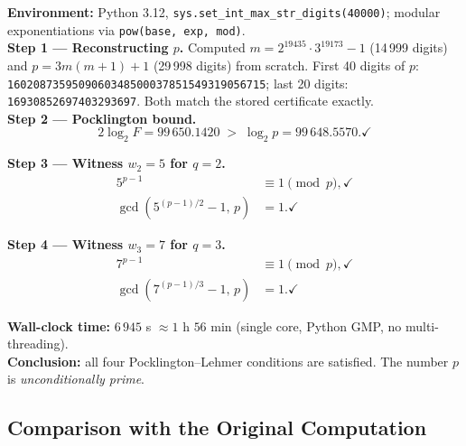 \begin{rigorousbox}[title={\textbf{Verification record} — independent computation}]
\textbf{Environment:} Python 3.12, \texttt{sys.set\_int\_max\_str\_digits(40000)};
modular exponentiations via \texttt{pow(base, exp, mod)}.\\[4pt]

\textbf{Step 1 — Reconstructing $p$.}\quad
Computed $m = 2^{19435}\cdot 3^{19173}-1$ (14\,999 digits) and
$p = 3m(m+1)+1$ (29\,998 digits) from scratch.
First 40 digits of $p$: \texttt{1602087359509060348500037851549319056715};
last 20 digits: \texttt{16930852697403293697}.
Both match the stored certificate exactly.\\[4pt]

\textbf{Step 2 — Pocklington bound.}
\[
  2\log_2 F = 99\,650.1420 \;>\; \log_2 p = 99\,648.5570. \checkmark
\]

\textbf{Step 3 — Witness $w_2 = 5$ for $q = 2$.}
\begin{align*}
  5^{p-1} &\equiv 1 \pmod{p}, \checkmark \\
  \gcd(5^{(p-1)/2}-1,\,p) &= 1. \checkmark
\end{align*}

\textbf{Step 4 — Witness $w_3 = 7$ for $q = 3$.}
\begin{align*}
  7^{p-1} &\equiv 1 \pmod{p}, \checkmark \\
  \gcd(7^{(p-1)/3}-1,\,p) &= 1. \checkmark
\end{align*}

\textbf{Wall-clock time:} $6\,945$ s $\approx 1$ h $56$ min
(single core, Python GMP, no multi-threading).\\[4pt]

\textbf{Conclusion:} all four Pocklington–Lehmer conditions are satisfied.
The number $p$ is \emph{unconditionally prime}.
\end{rigorousbox}

\subsection{Comparison with the Original Computation}

